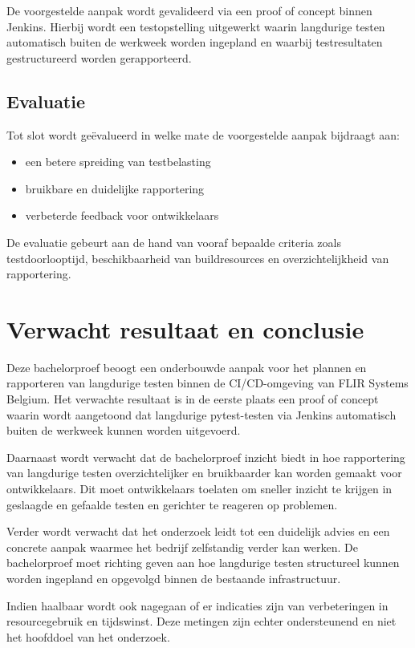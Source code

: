 De voorgestelde aanpak wordt gevalideerd via een proof of concept binnen Jenkins. Hierbij wordt een testopstelling uitgewerkt waarin langdurige testen automatisch buiten de werkweek worden ingepland en waarbij testresultaten gestructureerd worden gerapporteerd.

\subsection{Evaluatie}

Tot slot wordt geëvalueerd in welke mate de voorgestelde aanpak bijdraagt aan:

\begin{itemize}
    \item een betere spreiding van testbelasting
    \item bruikbare en duidelijke rapportering
    \item verbeterde feedback voor ontwikkelaars
\end{itemize}

De evaluatie gebeurt aan de hand van vooraf bepaalde criteria zoals testdoorlooptijd, beschikbaarheid van buildresources en overzichtelijkheid van rapportering.



\section{Verwacht resultaat en conclusie}
\label{sec:verwachte_resultaten}

Deze bachelorproef beoogt een onderbouwde aanpak voor het plannen en rapporteren van 
langdurige testen binnen de CI/CD-omgeving van FLIR Systems Belgium. Het verwachte 
resultaat is in de eerste plaats een proof of concept waarin wordt aangetoond dat langdurige 
pytest-testen via Jenkins automatisch buiten de werkweek kunnen worden uitgevoerd.

Daarnaast wordt verwacht dat de bachelorproef inzicht biedt in hoe rapportering van langdurige 
testen overzichtelijker en bruikbaarder kan worden gemaakt voor ontwikkelaars. Dit moet 
ontwikkelaars toelaten om sneller inzicht te krijgen in geslaagde en gefaalde testen en gerichter 
te reageren op problemen.

Verder wordt verwacht dat het onderzoek leidt tot een duidelijk advies en een concrete aanpak 
waarmee het bedrijf zelfstandig verder kan werken. De bachelorproef moet richting geven aan 
hoe langdurige testen structureel kunnen worden ingepland en opgevolgd binnen de bestaande 
infrastructuur. 

Indien haalbaar wordt ook nagegaan of er indicaties zijn van verbeteringen in resourcegebruik en 
tijdswinst. Deze metingen zijn echter ondersteunend en niet het hoofddoel van het onderzoek.


